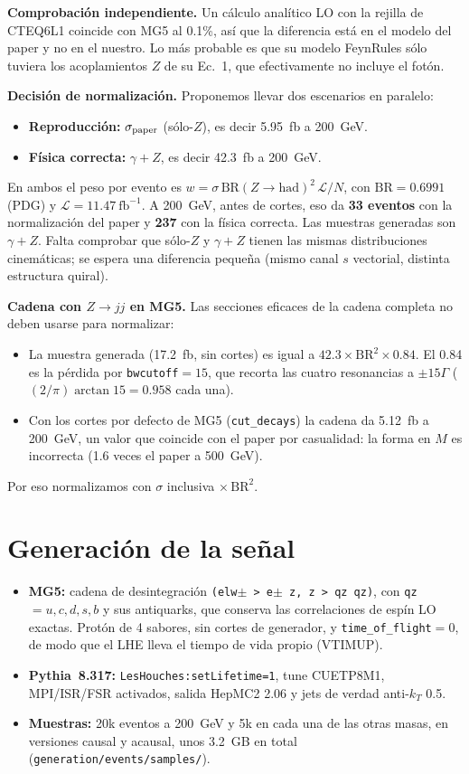 \documentclass[11pt,a4paper]{article}
\newcommand{\obs}[1]{\par\smallskip\noindent\colorbox{orange!12}{\parbox{\dimexpr\linewidth-2\fboxsep}{\small #1}}\par\smallskip}
\begin{document}
\textbf{Comprobación independiente.} Un cálculo analítico LO con la rejilla de CTEQ6L1 coincide con MG5 al 0.1\%, así que la diferencia está en el modelo del paper y no en el nuestro. Lo más probable es que su modelo FeynRules sólo tuviera los acoplamientos $Z$ de su Ec.~1, que efectivamente no incluye el fotón.

\obs{\textbf{Decisión de normalización.} Proponemos llevar dos escenarios en paralelo:
\begin{itemize}
\item \textbf{Reproducción:} $\sigma_{\rm paper}$ (sólo-$Z$), es decir 5.95~fb a 200~GeV.
\item \textbf{Física correcta:} $\gamma+Z$, es decir 42.3~fb a 200~GeV.
\end{itemize}
En ambos el peso por evento es $w=\sigma\,\mathrm{BR}(Z\to\mathrm{had})^2\,\mathcal{L}/N$, con $\mathrm{BR}=0.6991$ (PDG) y $\mathcal{L}=11.47~\mathrm{fb}^{-1}$. A 200~GeV, antes de cortes, eso da \textbf{33 eventos} con la normalización del paper y \textbf{237} con la física correcta.
Las muestras generadas son $\gamma+Z$. Falta comprobar que sólo-$Z$ y $\gamma+Z$ tienen las mismas distribuciones cinemáticas; se espera una diferencia pequeña (mismo canal $s$ vectorial, distinta estructura quiral).}

\obs{\textbf{Cadena con $Z\to jj$ en MG5.} Las secciones eficaces de la cadena completa no deben usarse para normalizar:
\begin{itemize}
\item La muestra generada (17.2~fb, sin cortes) es igual a $42.3\times\mathrm{BR}^2\times0.84$. El 0.84 es la pérdida por \texttt{bwcutoff}$=15$, que recorta las cuatro resonancias a $\pm15\Gamma$ ($(2/\pi)\arctan15=0.958$ cada una).
\item Con los cortes por defecto de MG5 (\texttt{cut\_decays}) la cadena da 5.12~fb a 200~GeV, un valor que coincide con el paper por casualidad: la forma en $M$ es incorrecta (1.6 veces el paper a 500~GeV).
\end{itemize}
Por eso normalizamos con $\sigma$ inclusiva $\times\,\mathrm{BR}^2$.}

\section{Generación de la señal}
\begin{itemize}
\item \textbf{MG5:} cadena de desintegración \texttt{(elw$\pm$ > e$\pm$ z, z > qz qz)}, con \texttt{qz} $=u,c,d,s,b$ y sus antiquarks, que conserva las correlaciones de espín LO exactas. Protón de 4 sabores, sin cortes de generador, y \texttt{time\_of\_flight}$=0$, de modo que el LHE lleva el tiempo de vida propio (VTIMUP).
\item \textbf{Pythia~8.317:} \texttt{LesHouches:setLifetime=1}, tune CUETP8M1, MPI/ISR/FSR activados, salida HepMC2 2.06 y jets de verdad anti-$k_T$ 0.5.
\item \textbf{Muestras:} 20k eventos a 200~GeV y 5k en cada una de las otras masas, en versiones causal y acausal, unos 3.2~GB en total (\texttt{generation/events/samples/}).
\end{itemize}
\end{document}
